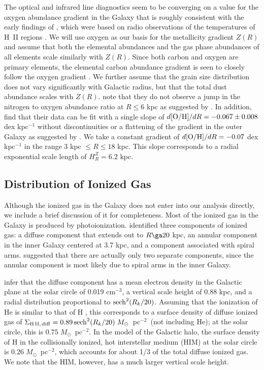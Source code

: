 \documentclass[12pt,preprint,flushrt]{aastex}
\newcommand{\ee}{$^{-2}$}
\newcommand{\eee}{$^{-3}$}
\begin{document}
The optical and infrared line diagnostics seem to be converging on
a value for the oxygen abundance gradient in the Galaxy that is roughly
consistent with the early findings of \cite{sh83}, which were based on
radio observations of the temperatures of H~II regions
\cite[e.g.,][]{torr77,si95,af96,af97,gumm98,roll00}.  We will use oxygen
as our basis for the metallicity gradient $Z(R)$ and assume that both the
elemental abundances and the gas phase abundances of all elements
scale similarly with $Z(R)$. Since both carbon and oxygen are primary
elements,  the elemental carbon abundance gradient is seen to
closely follow the oxygen gradient \citep{roll00}. We further assume
that the grain size distribution does not
vary significantly with Galactic radius, but that the total dust abundance
scales with $Z(R)$.
\cite{af97} note that they do not observe a jump in the nitrogen to
oxygen abundance ratio
at $R \le 6$ kpc as suggested by \cite{si95}.
In addition, \cite{roll00} find that their data can be fit with
a single slope of
$d[{\rm O/H}]/dR=-0.067\pm 0.008$ dex kpc$^{-1}$
without discontinuities \citep{twa97} or a flattening
of the gradient in the outer Galaxy as suggested by \cite{fi91}.
We take a constant gradient of $d[{\rm O/H}]/dR=-0.07$ dex kpc$^{-1}$
in the range 3 kpc $\le R \le 18$ kpc. This slope corresponds to a
radial exponential scale length of $H_R^Z = 6.2$ kpc.

\subsection{Distribution of Ionized Gas}
\label{sub:wim}

        Although the ionized gas in the Galaxy does not enter
into our analysis directly, we include a brief discussion of
it for completeness.
Most of the ionized gas in the Galaxy is
produced by photoionization.  \cite{tay93} identified three components of
ionized gas:
a diffuse component that extends out to $R\ga 20$ kpc,
an annular component in the inner Galaxy centered at 3.7 kpc,
and a component
associated with spiral arms. \cite{hei96} suggested that
there are actually only two separate
components, since the annular component is most likely
due to spiral arms in the inner Galaxy.

    \cite{tay93} infer that the diffuse component has a mean
electron density in the Galactic plane at the solar circle
of 0.019 cm\eee, a vertical
scale height of 0.88 kpc, and a radial distribution proportional
to ${\rm sech}^2(R_k/20)$.  Assuming that the ionization of He is similar
to that of H \citep{slav00}, this corresponds to a surface
density of diffuse ionized gas of $\Sigma_{\rm H\,II,\,diff}
=0.89\,{\rm sech}^2(R_k/20)\; M_\odot$~pc\ee\ (not including He); at the 
solar
circle, this is $0.75\;M_\odot$~pc\ee.  In the \cite{wol95b} model 
of the Galactic halo,
the surface density of H in the collisionally ionized, hot interstellar
medium (HIM) at the solar circle is $0.26\; M_\odot$~pc\ee, which accounts
for about 1/3 of the total diffuse ionized gas. We note that the HIM,
however, has a much larger vertical scale height.
\end{document}
